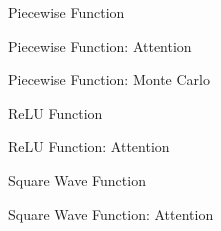 \documentclass[11pt]{article}
\theoremstyle{plain}
\begin{document}
\begin{figure}%
    \centering
    \qquad
    \caption{Piecewise Function}%
    \label{fig:example}%
\end{figure}
\begin{figure}%
    \centering
    \qquad
    \caption{Piecewise Function: Attention}%
    \label{fig:example}%
\end{figure}
\begin{figure}%
    \centering
    \qquad
    \caption{Piecewise Function: Monte Carlo}%
    \label{fig:example}%
\end{figure}




\begin{figure}%
    \centering
    \qquad
    \caption{ReLU Function}%
    \label{fig:example}%
\end{figure}
\begin{figure}%
    \centering
    \qquad
    \caption{ReLU Function: Attention}%
    \label{fig:example}%
\end{figure}




\begin{figure}%
    \centering
    \qquad
    \caption{Square Wave Function}%
    \label{fig:example}%
\end{figure}
\begin{figure}%
    \centering
    \qquad
    \caption{Square Wave Function: Attention}%
    \label{fig:example}%
\end{figure}
\end{document}
